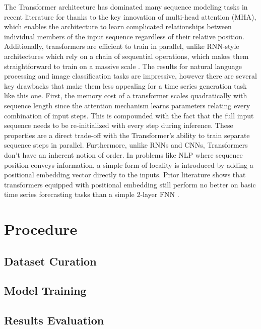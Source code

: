 \documentclass[11pt]{article}
\begin{document}
\begin{multicols}{2}
    The Transformer architecture has dominated many sequence modeling tasks in recent literature for thanks to the key innovation of multi-head attention (MHA), which enables the architecture to learn complicated relationships between individual members of the input sequence regardless of their relative position. Additionally, transformers are efficient to train in parallel, unlike RNN-style architectures which rely on a chain of sequential operations, which makes them straightforward to train on a massive scale \cite{vaswani_attention_2017}. The results for natural language processing \cite{devlin_bert_2019} and image classification \cite{dosovitskiy_image_2021} tasks are impressive, however there are several key drawbacks that make them less appealing for a time series generation task like this one. First, the memory cost of a transformer scales quadratically with sequence length since the attention mechanism learns parameters relating every combination of input steps. This is compounded with the fact that the full input sequence needs to be re-initialized with every step during inference. These properties are a direct trade-off with the Transformer's ability to train separate sequence steps in parallel. Furthermore, unlike RNNs and CNNs, Transformers don't have an inherent notion of order. In problems like NLP where sequence position conveys information, a simple form of locality is introduced by adding a positional embedding vector directly to the inputs. Prior literature shows that transformers equipped with positional embedding still perform no better on basic time series forecasting tasks than a simple 2-layer FNN \cite{zeng_are_2022}.

\end{multicols}


\section{Procedure}

\subsection{Dataset Curation}

\subsection{Model Training}

\subsection{Results Evaluation}


\end{document}
